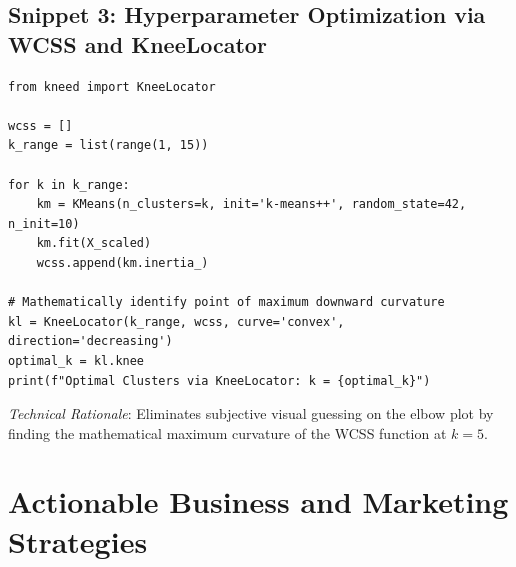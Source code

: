 \documentclass[11pt,a4paper]{article}
\begin{document}
\subsection{Snippet 3: Hyperparameter Optimization via WCSS and KneeLocator}
\begin{lstlisting}[caption={WCSS Computation and Automated KneeLocator Detection.}]
from kneed import KneeLocator

wcss = []
k_range = list(range(1, 15))

for k in k_range:
    km = KMeans(n_clusters=k, init='k-means++', random_state=42, n_init=10)
    km.fit(X_scaled)
    wcss.append(km.inertia_)

# Mathematically identify point of maximum downward curvature
kl = KneeLocator(k_range, wcss, curve='convex', direction='decreasing')
optimal_k = kl.knee
print(f"Optimal Clusters via KneeLocator: k = {optimal_k}")
\end{lstlisting}
\textit{Technical Rationale}: Eliminates subjective visual guessing on the elbow plot by finding the mathematical maximum curvature of the WCSS function at $k=5$.

\section{Actionable Business and Marketing Strategies}
\end{document}
